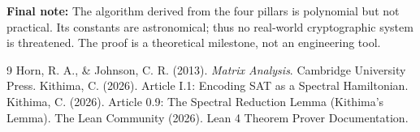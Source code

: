 \documentclass[11pt,a4paper]{article}
\begin{document}
\vspace{0.5cm}
\noindent\textbf{Final note:} The algorithm derived from the four pillars is polynomial but not practical. Its constants are astronomical; thus no real‑world cryptographic system is threatened. The proof is a theoretical milestone, not an engineering tool.


\begin{thebibliography}{9}
  Horn, R. A., \& Johnson, C. R. (2013). \emph{Matrix Analysis}. Cambridge University Press.
  Kithima, C. (2026). Article I.1: Encoding SAT as a Spectral Hamiltonian.
  Kithima, C. (2026). Article 0.9: The Spectral Reduction Lemma (Kithima's Lemma).
  The Lean Community (2026). Lean 4 Theorem Prover Documentation.
\end{thebibliography}
\end{document}
